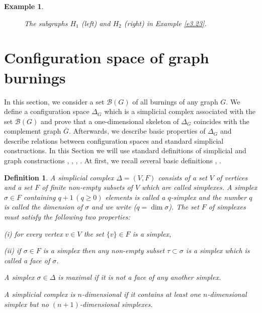 \documentclass[a4paper, 11pt]{article}
\newtheorem{definition}[theorem]{Definition}
\newtheorem{example}[theorem]{Example}
\begin{document}
\begin{example}
\begin{figure}[H]
  \caption{The subgraphs  $H_1$ (left) and $H_2$ (right) in Example \ref{e3.23}. }
\label{H1}
\end{figure}
\end{example}





\section{Configuration space of  graph burnings}\label{S4}
\setcounter{equation}{0}

In this section,  we consider a set $\mathcal B(G)$ of all burnings of any graph $G$. We define  a configuration space   $\Delta_G$  which is a simplicial complex associated with the set  $\mathcal B(G)$ and prove that a one-dimensional skeleton of $\Delta_G$ coincides with the complement graph $\overline G$.  Afterwards,  we    describe  basic properties of $\Delta_G$ and describe relations between configuration spaces and standard  simplicial constructions.  
In this Section we will use standard definitions of simplicial and graph constructions \cite{Hatcher}, \cite{MiHomotopy},    \cite{Munkres}, \cite{Prasolov}. At first,   we recall  several basic  definitions  \cite{semi}, \cite{May}.
  

\begin{definition} \label{d4.1} \rm
A \emph{simplicial complex} $\Delta =(V,F)$ consists of a set $V$ of \emph{vertices} and a set $F$
of finite non-empty subsets of $V$ which are called \emph{simplexes}.  A simplex  $\sigma \in F$ containing $q+1 \, (q\geq 0) $ elements    is called a
$q$-\emph{simplex}  and the number $q$ is called the \emph{dimension} of $\sigma$ and we write  ($q=\operatorname{dim} \sigma$).  The set $F$ of simplexes must satisfy the following two properties:

(i) for every vertex $v\in V$  the set $\{v\}\in F$ is a simplex, 

(ii) if $\sigma \in F$ is a simplex then any   non-empty subset $\tau\subset \sigma$ is a simplex which is called  a \emph{face} of $\sigma$.


A simplex $\sigma\in \Delta$ is \emph{maximal} if it is not a face of any another simplex. 

A simplicial complex is $n$-\emph{dimensional} if it contains at least one $n$-dimen\-sional simplex but
no $(n+1)$-dimensional simplexes. 
\end{definition}
\end{document}
